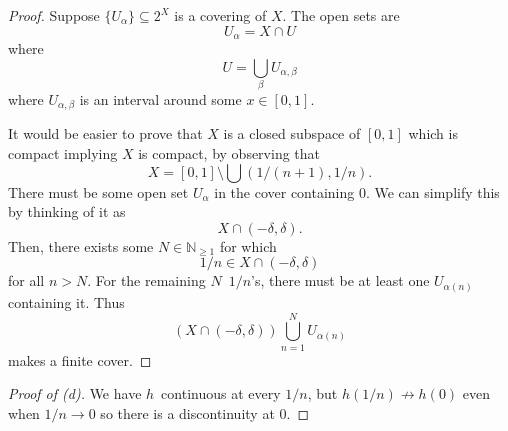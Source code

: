 \documentclass[11pt]{article}
\begin{document}
\begin{proof}
    Suppose $\{U_\alpha\} \subseteq 2^X$ is a covering of 
    $X$. 
    The open sets are 
    \[
        U_\alpha = X \cap U 
    \]
    where 
    \[
        U = \bigcup_{\beta} U_{\alpha,\beta}
    \]
    where $U_{\alpha,\beta}$ is an interval around some 
    $x \in [0,1]$. 

    It would be easier to prove that $X$ is a closed 
    subspace of $[0,1]$ which is compact implying $X$ is compact,  
    by observing that 
    \[
        X = [0,1] \setminus \bigcup (1/(n+1), 
        1/n).
    \]
    There must be some open set $U_\alpha$ in the 
    cover containing $0$. We can simplify this by thinking 
    of it as 
    \[
        X \cap (-\delta, \delta). 
    \]
    Then, there exists some $N \in \mathbb N_{\geq 1}$ for which 
    \[
        1/n \in X \cap (-\delta, \delta)
    \]
    for all $n > N$. 
    For the remaining $N$ $1/n$'s, there must be at least one 
    $U_{\alpha(n)}$ containing it. 
    Thus 
    \[
        (X \cap (-\delta, \delta)) 
        \bigcup_{n=1}^N U_{\alpha(n)}
    \]
    makes a finite cover. 
\end{proof}
\begin{proof}[Proof of (d)]
    We have 
    $h$ continuous at every $1/n$, but 
    $h(1/n) \not\to h(0)$ even when 
    $1/n \to 0$ so there is a discontinuity at $0$. 
\end{proof}
\end{document}
